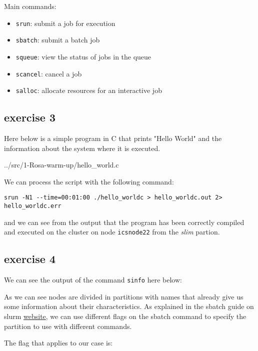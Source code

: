 Main commands:
\begin{itemize}
    \item \texttt{srun}: submit a job for execution
    \item \texttt{sbatch}: submit a batch job
    \item \texttt{squeue}: view the status of jobs in the queue
    \item \texttt{scancel}: cancel a job
    \item \texttt{salloc}: allocate resources for an interactive job
\end{itemize}

\subsection{exercise 3}
Here below is a simple program in C that prints "Hello World" and the information about the system where it is executed.

{../src/1-Rosa-warm-up/hello_world.c}

We can process the script with the following command:    
\begin{verbatim}
srun -N1 --time=00:01:00 ./hello_worldc > hello_worldc.out 2> hello_worldc.err
\end{verbatim}
and we can see from the output that the program has been correctly compiled and executed on the cluster on node \texttt{icsnode22} from the \textit{slim} partion.



\subsection{exercise 4}
We can see the output of the command \texttt{sinfo} here below: 



As we can see nodes are divided in partitions with names that already give us some information about their characteristics.
As explained in the sbatch guide on slurm \href{https://slurm.schedmd.com/sbatch.html}{website}, we can use different flags on the sbatch command to specify the partition to use with different commands.


The flag that applies to our case is:

